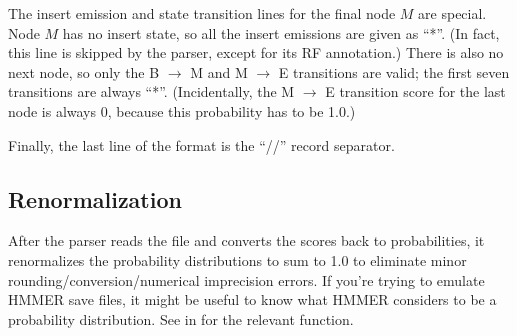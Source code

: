 The insert emission and state transition lines for the final node $M$
are special.  Node $M$ has no insert state, so all the insert
emissions are given as ``*''. (In fact, this line is skipped by the
parser, except for its RF annotation.) There is also no next node, so
only the B $\rightarrow$ M and M $\rightarrow$ E transitions are
valid; the first seven transitions are always ``*''.  (Incidentally,
the M $\rightarrow$ E transition score for the last node is always 0,
because this probability has to be 1.0.)

Finally, the last line of the format is the ``//'' record separator.

\subsection{Renormalization}

After the parser reads the file and converts the scores back to
probabilities, it renormalizes the probability distributions to sum to
1.0 to eliminate minor rounding/conversion/numerical imprecision
errors.  If you're trying to emulate HMMER save files, it might be
useful to know what HMMER considers to be a probability
distribution. See
 in  for the relevant
function.

